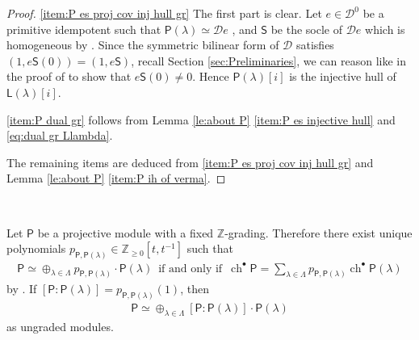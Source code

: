 \documentclass[reqno]{amsart}
\renewcommand{\_}[1]{_{\left( #1 \right)}}
\renewcommand{\^}[1]{^{\left( #1 \right)}}
\newcommand\fL{\mathsf{L}}
\newcommand\fP{\mathsf{P}}
\newcommand\fS{\mathsf{S}}
\newcommand{\Z}{{\mathbb Z}}
\newcommand{\D}{\mathcal{D}}
\newcommand{\chgr}{\operatorname{ch}^{\bullet}}
\theoremstyle{plain}
\theoremstyle{definition}
\theoremstyle{remark}
\begin{document}
\begin{proof}
\ref{item:P es proj cov inj hull gr} The first part is clear. Let $e\in\D^0$ be a primitive idempotent such that $\fP(\lambda)\simeq\D e$ \cite[Proposition 5.8 (iii)]{MR659212}, and $\fS$ be the socle of $\D e$ which is homogeneous by \cite[Proposition 3.5 (ii)]{MR659212}. Since the symmetric bilinear form of $\D$ satisfies $(1,e\fS(0))=(1,e\fS)$, recall Section \ref{sec:Preliminaries}, we can reason like in the proof of \cite[(9.12)]{MR1038525} to show that $e\fS(0)\neq0$. Hence $\fP(\lambda)[i]$ is the injective hull of $\fL(\lambda)[i]$.


\ref{item:P dual gr} follows from Lemma \ref{le:about P} \ref{item:P es injective hull} and \eqref{eq:dual gr Llambda}.

The remaining items are deduced from \ref{item:P es proj cov inj hull gr} and Lemma \ref{le:about P} \ref{item:P ih of verma}.
\end{proof}



\

Let $\fP$ be a projective module with a fixed $\Z$-grading. Therefore there exist unique polynomials $p_{\fP,\fP(\lambda)}\in\Z_{\geq0}[t,t^{-1}]$ such that
\begin{align}
\label{eq:proj D mod}
\fP\simeq\oplus_{\lambda\in\Lambda}p_{\fP,\fP(\lambda)}\cdot\fP(\lambda)\,\mbox{ if and only if }\,
\chgr\fP=\sum_{\lambda\in\Lambda}p_{\fP,\fP(\lambda)}\chgr\fP(\lambda)
\end{align}
by \cite[Proposition 5.8 (iii)]{MR659212}. If $[\fP:\fP(\lambda)]=p_{\fP,\fP(\lambda)}(1)$, then
\begin{align}
\fP\simeq\oplus_{\lambda\in\Lambda}[\fP:\fP(\lambda)]\cdot\fP(\lambda)
\end{align}
as ungraded modules.

\
\end{document}
